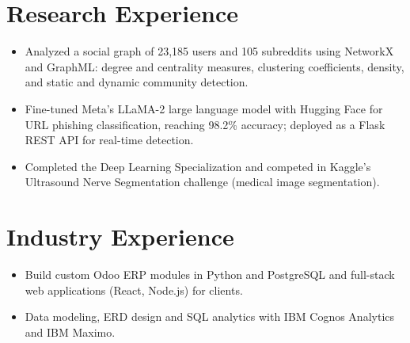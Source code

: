 \section{Research Experience}
\begin{itemize}
  \item Analyzed a social graph of 23,185 users and 105 subreddits using NetworkX and GraphML: degree and centrality measures, clustering coefficients, density, and static and dynamic community detection.
\end{itemize}
\begin{itemize}
  \item Fine-tuned Meta's LLaMA-2 large language model with Hugging Face for URL phishing classification, reaching 98.2\% accuracy; deployed as a Flask REST API for real-time detection.
\end{itemize}
\begin{itemize}
  \item Completed the Deep Learning Specialization and competed in Kaggle's Ultrasound Nerve Segmentation challenge (medical image segmentation).
\end{itemize}

\section{Industry Experience}
\begin{itemize}
  \item Build custom Odoo ERP modules in Python and PostgreSQL and full-stack web applications (React, Node.js) for clients.
\end{itemize}
\begin{itemize}
  \item Data modeling, ERD design and SQL analytics with IBM Cognos Analytics and IBM Maximo.
\end{itemize}


